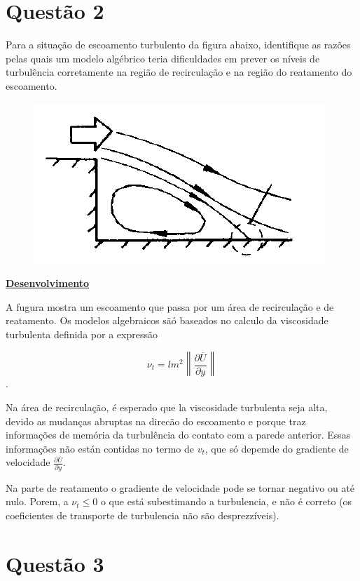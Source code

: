 \documentclass[12pt]{article}
\begin{document}
\section*{Questão 2}

Para a situação de escoamento turbulento da figura abaixo, identifique as razões pelas quais um modelo algébrico teria dificuldades em prever os níveis de turbulência corretamente na região de recirculação e na região do reatamento do escoamento.\\

\begin{figure}[H]
	\centering
	\includegraphics[width=.65\textwidth]{figures/1}
\end{figure}

\textbf{\underline{Desenvolvimento}}

A fugura mostra um escoamento que passa por um área de recirculação e de reatamento. Os modelos algebraicos sãó baseados no calculo da viscosidade turbulenta definida por a expressão

\begin{equation}
	\nu_t = lm^2\left\| \frac{\partial \overline{U}}{\partial y}\right\| 
\end{equation}.

Na área de recirculação, é esperado que la viscosidade turbulenta seja alta, devido as mudanças abruptas na direcão do escoamento e porque traz informações de memória da turbulência do contato com a parede anterior. Essas informações não están contidas no termo de $v_t$, que só depemde do gradiente de velocidade $\frac{\partial \overline{U}}{\partial y}$.

Na parte de reatamento o gradiente de velocidade pode se tornar negativo ou até nulo. Porem, a $\nu_t  \leq 0 $ o que está subestimando a turbulencia, e não é correto (os coeficientes de transporte de turbulencia não são desprezzíveis).


\section*{Questão 3}
\end{document}
